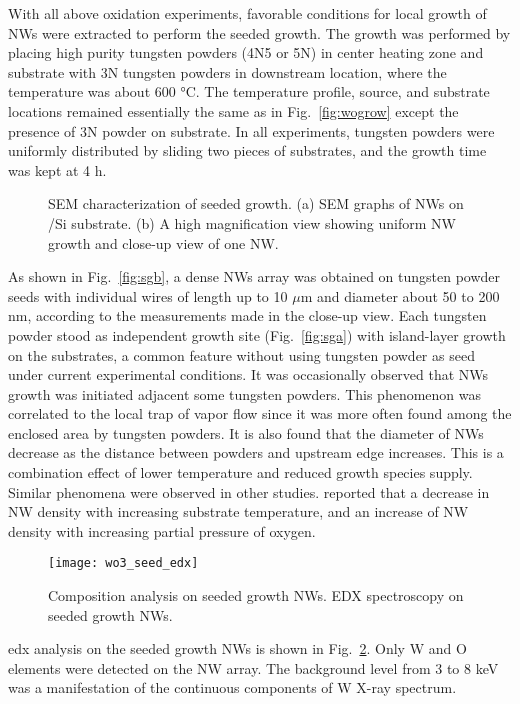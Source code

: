 With all above oxidation experiments, favorable conditions for local growth of NWs were extracted to perform the seeded growth. The growth was performed by placing high purity tungsten powders (4N5 or 5N) in center heating zone and substrate with 3N tungsten powders in downstream location, where the temperature was about 600 \si{\degreeCelsius}. The temperature profile, source, and substrate locations remained essentially the same as in Fig.~\ref{fig:wogrow} except the presence of 3N powder on substrate. In all experiments, tungsten powders were uniformly distributed by sliding two pieces of substrates, and the growth time was kept at 4 h.
\begin{figure}[htb]
\centering
{}\hspace{0.04\textwidth}
\caption[SEM characterization of  seeded growth]{SEM characterization of  seeded growth. (a) SEM graphs of  NWs on /Si substrate. (b) A high magnification view showing uniform NW growth and close-up view of one NW.}
\label{fig:woseedsem}
\end{figure}
As shown in Fig.~\ref{fig:sgb}, a dense NWs array was obtained on tungsten powder seeds with individual wires of length up to 10 $\mu$m and diameter about 50 to 200 nm, according to the measurements made in the close-up view. Each tungsten powder stood as independent growth site (Fig.~\ref{fig:sga}) with island-layer growth on the substrates, a common feature without using tungsten powder as seed under current experimental conditions. It was occasionally observed that NWs growth was initiated adjacent some tungsten powders. This phenomenon was correlated to the local trap of vapor flow since it was more often found among the enclosed area by tungsten powders. It is also found that the diameter of NWs decrease as the distance between powders and upstream edge increases. This is a combination effect of lower temperature and reduced  growth species supply. Similar phenomena were observed in other studies. \citeauthor{Thangala2007} reported that a decrease in NW density with increasing substrate temperature, and an increase of NW density with increasing partial pressure of oxygen.\cite{Thangala2007}

\begin{figure}[htb]
\centering
\texttt{[image: wo3\_seed\_edx]}
\caption[Composition analysis on seeded growth  NWs]{Composition analysis on seeded growth  NWs. EDX spectroscopy on seeded growth  NWs.}
\label{fig:woedx}
\end{figure}
\gls{edx} analysis on the seeded growth  NWs is shown in Fig.~\ref{fig:woedx}. Only W and O elements were detected on the NW array. The background level from 3 to 8 keV was a manifestation of the continuous components of W X-ray spectrum. 

